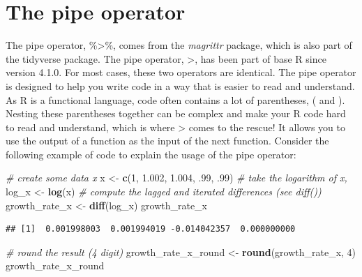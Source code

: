 \documentclass[
  12pt,
  oneside]{book}
\newenvironment{Shaded}{\begin{snugshade}}{\end{snugshade}}
\newcommand{\CommentTok}[1]{\textcolor[rgb]{0.56,0.35,0.01}{\textit{#1}}}
\newcommand{\DecValTok}[1]{\textcolor[rgb]{0.00,0.00,0.81}{#1}}
\newcommand{\FloatTok}[1]{\textcolor[rgb]{0.00,0.00,0.81}{#1}}
\newcommand{\FunctionTok}[1]{\textcolor[rgb]{0.13,0.29,0.53}{\textbf{#1}}}
\newcommand{\NormalTok}[1]{#1}
\newcommand{\OtherTok}[1]{\textcolor[rgb]{0.56,0.35,0.01}{#1}}
\begin{document}
\hypertarget{pipeoperator}{%
\section{The pipe operator}\label{pipeoperator}}

The pipe operator, \%\textgreater\%, comes from the \emph{magrittr} package, which is also part of the tidyverse package. The pipe operator, \textbar\textgreater, has been part of base R since version 4.1.0. For most cases, these two operators are identical. The pipe operator is designed to help you write code in a way that is easier to read and understand. As R is a functional language, code often contains a lot of parentheses, ( and ). Nesting these parentheses together can be complex and make your R code hard to read and understand, which is where \textbar\textgreater{} comes to the rescue! It allows you to use the output of a function as the input of the next function. Consider the following example of code to explain the usage of the pipe operator:

\begin{Shaded}
\begin{Highlighting}[]
\CommentTok{\# create some data \textasciigrave{}x\textasciigrave{}}
\NormalTok{x }\OtherTok{\textless{}{-}} \FunctionTok{c}\NormalTok{(}\DecValTok{1}\NormalTok{, }\FloatTok{1.002}\NormalTok{, }\FloatTok{1.004}\NormalTok{, .}\DecValTok{99}\NormalTok{, .}\DecValTok{99}\NormalTok{)}
\CommentTok{\# take the logarithm of \textasciigrave{}x\textasciigrave{}, }
\NormalTok{log\_x }\OtherTok{\textless{}{-}} \FunctionTok{log}\NormalTok{(x)}
\CommentTok{\# compute the lagged and iterated differences (see \textasciigrave{}diff()\textasciigrave{})}
\NormalTok{growth\_rate\_x }\OtherTok{\textless{}{-}} \FunctionTok{diff}\NormalTok{(log\_x)}
\NormalTok{growth\_rate\_x}
\end{Highlighting}
\end{Shaded}

\begin{verbatim}
## [1]  0.001998003  0.001994019 -0.014042357  0.000000000
\end{verbatim}

\begin{Shaded}
\begin{Highlighting}[]
\CommentTok{\# round the result (4 digit)}
\NormalTok{growth\_rate\_x\_round }\OtherTok{\textless{}{-}} \FunctionTok{round}\NormalTok{(growth\_rate\_x, }\DecValTok{4}\NormalTok{)}
\NormalTok{growth\_rate\_x\_round }
\end{Highlighting}
\end{Shaded}
\end{document}

